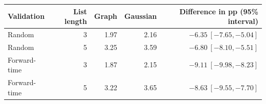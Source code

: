 \begin{tabular}{lrrrr}
\toprule
Validation & List length & Graph & Gaussian & Difference in pp (95\% interval) \\
\midrule
Random & 3 & 1.97 & 2.16 & $-6.35~[-7.65, -5.04]$ \\
Random & 5 & 3.25 & 3.59 & $-6.80~[-8.10, -5.51]$ \\
Forward-time & 3 & 1.87 & 2.15 & $-9.11~[-9.98, -8.23]$ \\
Forward-time & 5 & 3.22 & 3.65 & $-8.63~[-9.55, -7.70]$ \\
\bottomrule
\end{tabular}
